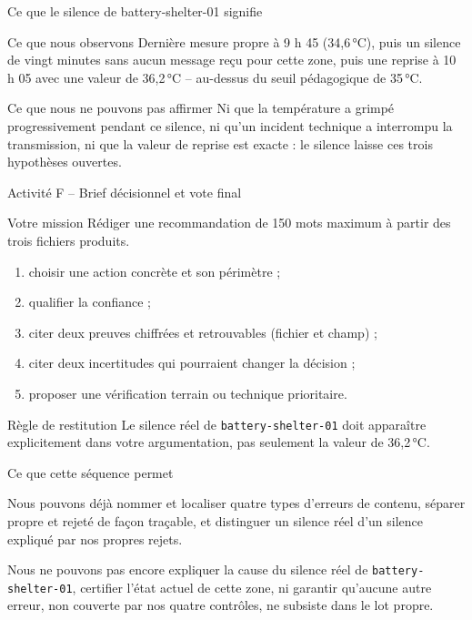 \documentclass[aspectratio=169]{beamer}
\begin{document}
\begin{frame}{Ce que le silence de battery-shelter-01 signifie}
  \begin{block}{Ce que nous observons}
    Dernière mesure propre à 9 h 45 (34,6\,°C), puis un silence de vingt minutes sans aucun message reçu pour cette zone, puis une reprise à 10 h 05 avec une valeur de 36,2\,°C -- au-dessus du seuil pédagogique de 35\,°C.
  \end{block}
  \begin{alertblock}{Ce que nous ne pouvons pas affirmer}
    Ni que la température a grimpé progressivement pendant ce silence, ni qu'un incident technique a interrompu la transmission, ni que la valeur de reprise est exacte : le silence laisse ces trois hypothèses ouvertes.
  \end{alertblock}
\end{frame}

\begin{frame}{Activité F -- Brief décisionnel et vote final}
  \begin{block}{Votre mission}
    Rédiger une recommandation de 150 mots maximum à partir des trois fichiers produits.
  \end{block}
  \begin{enumerate}
    \item choisir une action concrète et son périmètre ;
    \item qualifier la confiance ;
    \item citer deux preuves chiffrées et retrouvables (fichier et champ) ;
    \item citer deux incertitudes qui pourraient changer la décision ;
    \item proposer une vérification terrain ou technique prioritaire.
  \end{enumerate}
  \begin{alertblock}{Règle de restitution}
    Le silence réel de \texttt{battery-shelter-01} doit apparaître explicitement dans votre argumentation, pas seulement la valeur de 36,2\,°C.
  \end{alertblock}
\end{frame}

\begin{frame}{Ce que cette séquence permet}
  \begin{block}{Nous pouvons déjà}
    nommer et localiser quatre types d'erreurs de contenu, séparer propre et rejeté de façon traçable, et distinguer un silence réel d'un silence expliqué par nos propres rejets.
  \end{block}
  \begin{alertblock}{Nous ne pouvons pas encore}
    expliquer la cause du silence réel de \texttt{battery-shelter-01}, certifier l'état actuel de cette zone, ni garantir qu'aucune autre erreur, non couverte par nos quatre contrôles, ne subsiste dans le lot propre.
  \end{alertblock}
\end{frame}
\end{document}
